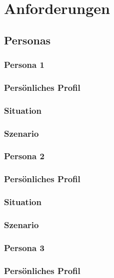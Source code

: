 \section{Anforderungen}

\subsection{Personas}
\subsubsection{Persona 1}
\subsubsection*{Persönliches Profil}

\subsubsection*{Situation}

\subsubsection*{Szenario}

\subsubsection{Persona 2}
\subsubsection*{Persönliches Profil}

\subsubsection*{Situation}

\subsubsection*{Szenario}

\subsubsection{Persona 3}
\subsubsection*{Persönliches Profil}

